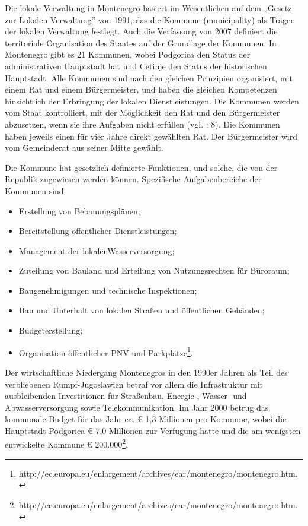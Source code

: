 Die lokale Verwaltung in Montenegro basiert im Wesentlichen auf dem „Gesetz zur Lokalen Verwaltung” von 1991, das die Kommune (municipality) als Träger der lokalen Verwaltung festlegt. Auch die Verfassung von 2007 definiert die territoriale Organisation des Staates auf der Grundlage der Kommunen. In Montenegro gibt es 21 Kommunen, wobei Podgorica den Status der administrativen Hauptstadt hat und Cetinje den Status der historischen Hauptstadt. Alle Kommunen sind nach den gleichen Prinzipien organisiert, mit einem Rat und einem Bürgermeister, und haben die gleichen Kompetenzen hinsichtlich der Erbringung der lokalen Dienstleistungen. Die Kommunen werden vom Staat kontrolliert, mit der Möglichkeit den Rat und den Bürgermeister abzusetzen, wenn sie ihre Aufgaben nicht erfüllen (vgl. \cite{oecd08b} : 8). Die Kommunen haben jeweils einen für vier Jahre direkt gewählten Rat. Der Bürgermeister wird vom Gemeinderat aus seiner Mitte gewählt.\par
Die Kommune hat gesetzlich definierte Funktionen, und solche, die von der Republik zugewiesen werden können. Spezifische Aufgabenbereiche der Kommunen sind:
\begin{itemize} \itemsep1pt \parskip0pt 
\item Erstellung von Bebauungsplänen;
\item Bereitstellung öffentlicher Dienstleistungen;
\item Management der lokalenWasserversorgung;
\item Zuteilung von Bauland und Erteilung von Nutzungsrechten für Büroraum;
\item Baugenehmigungen und technische Inspektionen;
\item Bau und Unterhalt von lokalen Straßen und öffentlichen Gebäuden;
\item Budgeterstellung;
\item Organisation öffentlicher PNV und Parkplätze\footnote{http://ec.europa.eu/enlargement/archives/ear/montenegro/montenegro.htm.}. 
\end{itemize}
Der wirtschaftliche Niedergang Montenegros in den 1990er Jahren als Teil des verbliebenen Rumpf-Jugoslawien betraf vor allem die Infrastruktur mit ausbleibenden Investitionen für Straßenbau, Energie-, Wasser- und Abwasserversorgung sowie Telekommunikation. Im Jahr 2000 betrug das kommunale Budget für das Jahr ca.  \euro{}  1,3 Millionen pro Kommune, wobei die Hauptstadt Podgorica  \euro{}  7,0 Millionen zur Verfügung hatte und die am wenigsten entwickelte Kommune  \euro{} 200.000\footnote{http://ec.europa.eu/enlargement/archives/ear/montenegro/montenegro.htm.}.\par
